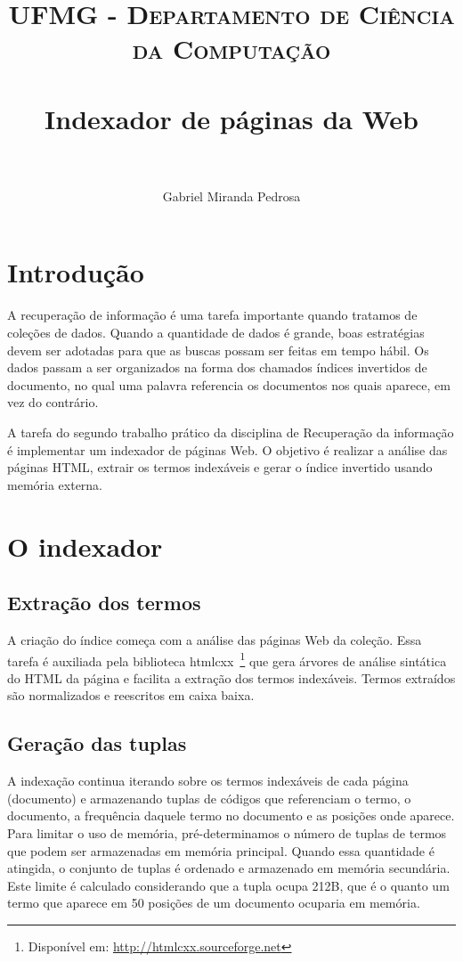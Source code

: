 \documentclass[paper=a4, fontsize=11pt]{scrartcl}
\title{
		\usefont{OT1}{bch}{b}{n}
		\normalfont \normalsize \textsc{UFMG - Departamento de Ciência da Computação} \\ [25pt]
		\horrule{0.5pt} \\[0.4cm]
		\huge Indexador de páginas da Web \\
		\horrule{2pt} \\[0.5cm]
}
\author{
		\normalfont 								\normalsize
        Gabriel Miranda Pedrosa\\[-3pt]		\normalsize
}
\numberwithin{equation}{section}		%
\numberwithin{figure}{section}			%
\numberwithin{table}{section}				%
\begin{document}
\maketitle
\section{Introdução}
A recuperação de informação é uma tarefa importante quando tratamos de coleções de dados. Quando a quantidade de dados é grande, boas estratégias devem ser adotadas para que as buscas possam ser feitas em tempo hábil. Os dados passam a ser organizados na forma dos chamados índices invertidos de documento, no qual uma palavra referencia os documentos nos quais aparece, em vez do contrário. 

A tarefa do segundo trabalho prático da disciplina de Recuperação da informação é implementar um indexador de páginas Web. O objetivo é realizar a análise das páginas HTML, extrair os termos indexáveis e gerar o índice invertido usando memória externa.

\section{O indexador}
\subsection{Extração dos termos}
A criação do índice começa com a análise das páginas Web da coleção. Essa tarefa é auxiliada pela biblioteca htmlcxx~\footnote{Disponível em: \url{http://htmlcxx.sourceforge.net}} que gera árvores de análise sintática do HTML da página e facilita a extração dos termos indexáveis. Termos extraídos são normalizados e reescritos em caixa baixa.

\subsection{Geração das tuplas}
A indexação continua iterando sobre os termos indexáveis de cada página (documento) e armazenando tuplas de códigos que referenciam o termo, o documento, a frequência daquele termo no documento e as posições onde aparece. Para limitar o uso de memória, pré-determinamos o número de tuplas de termos que podem ser armazenadas em memória principal. Quando essa quantidade é atingida, o conjunto de tuplas é ordenado e armazenado em memória secundária. Este limite é calculado considerando que a tupla ocupa 212B, que é o quanto um termo que aparece em 50 posições de um documento ocuparia em memória.
\end{document}

